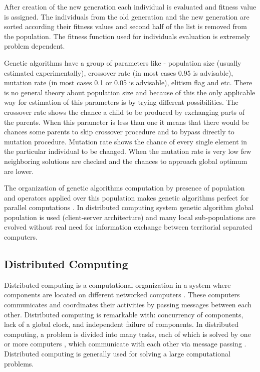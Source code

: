 \documentclass[graybox]{svmult}
\begin{document}
After creation of the new generation each individual is evaluated and fitness value is assigned. The individuals from the old generation and the new generation are sorted according their fitness values and second half of the list is removed from the population. The fitness function used for individuals evaluation is extremely problem dependent. 

Genetic algorithms have a group of parameters like - population size (usually estimated experimentally), crossover rate (in most cases 0.95 is advisable), mutation rate (in most cases 0.1 or 0.05 is advisable), elitism flag and etc. There is no general theory about population size and because of this the only applicable way for estimation of this parameters is by trying different possibilities. The crossover rate shows the chance a child to be produced by exchanging parts of the parents. When this parameter is less than one it means that there would be chances some parents to skip crossover procedure and to bypass directly to mutation procedure. Mutation rate shows the chance of every single element in the particular individual to be changed. When the mutation rate is very low few neighboring solutions are checked and the chances to approach global optimum are lower. 

The organization of genetic algorithms computation by presence of population and operators applied over this population makes genetic algorithms perfect for parallel computations \cite{cheng01}. In distributed computing system genetic algorithm global population is used (client-server architecture) and many local sub-populations are evolved without real need for information exchange between territorial separated computers. 

\subsection{Distributed Computing} \label{Distributed Computing}

Distributed computing is a computational organization in a system where components are located on different networked computers \cite{balabanov01}. These computers communicates and coordinates their activities by passing messages between each other. Distributed computing is remarkable with: concurrency of components, lack of a global clock, and independent failure of components. In distributed computing, a problem is divided into many tasks, each of which is solved by one or more computers \cite{godfrey01}, which communicate with each other via message passing \cite{andrews01}. Distributed computing is generally used for solving a large computational problems. 
\end{document}
